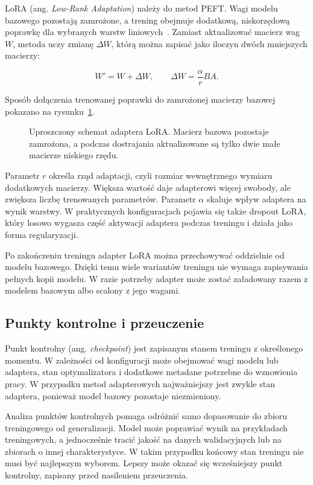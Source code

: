 LoRA (ang. \emph{Low-Rank Adaptation}) należy do metod PEFT. Wagi modelu
bazowego pozostają zamrożone, a trening obejmuje dodatkową, niskorzędową
poprawkę dla wybranych warstw liniowych~\autocite{hu-lora}. Zamiast aktualizować
macierz wag \(W\), metoda uczy zmianę
\(\Delta W\), którą można zapisać jako iloczyn dwóch mniejszych macierzy:

\[
W' = W + \Delta W,\qquad
\Delta W = \frac{\alpha}{r}BA.
\]

Sposób dołączenia trenowanej poprawki do zamrożonej macierzy bazowej pokazano
na rysunku~\ref{fig:lora-adapter}.

\begin{figure}[H]
\centering
\resizebox{0.96\textwidth}{!}{}
\caption[Uproszczony schemat adaptera LoRA]{Uproszczony schemat adaptera LoRA. Macierz bazowa pozostaje zamrożona,
a podczas dostrajania aktualizowane są tylko dwie małe macierze niskiego
rzędu.}
\label{fig:lora-adapter}
\end{figure}

Parametr \(r\) określa rząd adaptacji, czyli rozmiar wewnętrznego wymiaru
dodatkowych macierzy. Większa wartość daje adapterowi więcej swobody, ale
zwiększa liczbę trenowanych parametrów. Parametr \(\alpha\) skaluje wpływ
adaptera na wynik warstwy. W praktycznych konfiguracjach pojawia się także
dropout LoRA, który losowo wygasza część aktywacji adaptera podczas treningu i
działa jako forma regularyzacji.

Po zakończeniu treningu adapter LoRA można przechowywać oddzielnie od modelu
bazowego. Dzięki temu wiele wariantów treningu nie wymaga zapisywania pełnych
kopii modelu. W razie potrzeby adapter może zostać załadowany razem z modelem
bazowym albo scalony z jego wagami.

\subsection{Punkty kontrolne i przeuczenie}

Punkt kontrolny (ang. \emph{checkpoint}) jest zapisanym stanem treningu z
określonego momentu. W zależności od konfiguracji może obejmować wagi modelu lub
adaptera, stan optymalizatora i dodatkowe metadane potrzebne do wznowienia pracy.
W przypadku metod adapterowych najważniejszy jest zwykle stan adaptera, ponieważ
model bazowy pozostaje niezmieniony.

Analiza punktów kontrolnych pomaga odróżnić samo dopasowanie do zbioru
treningowego od generalizacji. Model może poprawiać wynik na przykładach
treningowych, a jednocześnie tracić jakość na danych walidacyjnych lub na
zbiorach o innej charakterystyce. W takim przypadku końcowy stan treningu nie
musi być najlepszym wyborem. Lepszy może okazać się wcześniejszy punkt
kontrolny, zapisany przed nasileniem przeuczenia.

